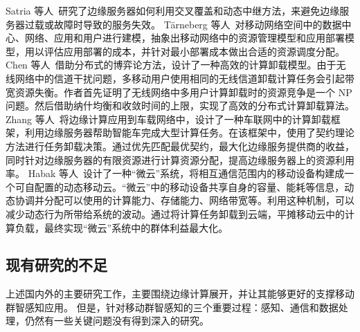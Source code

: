 Satria 等人~\cite{DBLP:journals/fgcs/SatriaPJ17}研究了边缘服务器如何利用交叉覆盖和动态中继方法，来避免边缘服务器过载或故障时导致的服务失效。
T{\"{a}}rneberg 等人~\cite{DBLP:journals/fgcs/TarnebergMWTEKE17}对移动网络空间中的数据中心、网络、应用和用户进行建模，抽象出移动网络中的资源管理模型和应用部署模型，用以评估应用部署的成本，并针对最小部署成本做出合适的资源调度分配。
Chen 等人~\cite{DBLP:journals/ton/ChenJLF16}借助分布式的博弈论方法，设计了一种高效的计算卸载模型。由于无线网络中的信道干扰问题，多移动用户使用相同的无线信道卸载计算任务会引起带宽资源失衡。作者首先证明了无线网络中多用户计算卸载时的资源竞争是一个 NP 问题。然后借助纳什均衡和收敛时间的上限，实现了高效的分布式计算卸载算法。
Zhang 等人~\cite{DBLP:conf/rndm/ZhangMLV016}将边缘计算应用到车载网络中，设计了一种车联网中的计算卸载框架，利用边缘服务器帮助智能车完成大型计算任务。在该框架中，使用了契约理论方法进行任务卸载决策。通过优先匹配最优契约，最大化边缘服务提供商的收益，同时针对边缘服务器的有限资源进行计算资源分配，提高边缘服务器上的资源利用率。
Habak 等人~\cite{DBLP:conf/IEEEcloud/HabakAHZ15}设计了一种“微云”系统，将相互通信范围内的移动设备构建成一个可自配置的动态移动云。“微云”中的移动设备共享自身的容量、能耗等信息，动态协调并分配可以使用的计算能力、存储能力、网络带宽等。利用这种机制，可以减少动态行为所带给系统的波动。通过将计算任务卸载到云端，平摊移动云中的计算负载，最终实现“微云”系统中的群体利益最大化。




\subsection{现有研究的不足}


上述国内外的主要研究工作，主要围绕边缘计算展开，并让其能够更好的支撑移动群智感知应用。
但是，针对移动群智感知的三个重要过程：感知、通信和数据处理，仍然有一些关键问题没有得到深入的研究。


